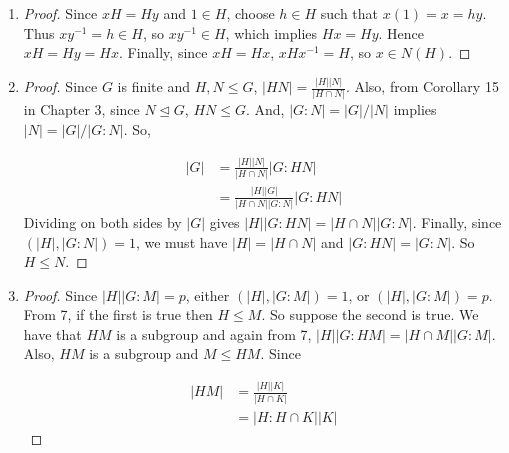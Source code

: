 \documentclass[11pt, letterpaper]{article}
\begin{document}
\begin{enumerate}
\begin{enumerate}
\begin{proof}
      Thus, $G$ is either Abelian or $\vert Z(G) \vert = 1$ so $Z(G) = 1$.
      \end{proof}
  \end{enumerate}
  \item \begin{proof}
    Since $xH = Hy$ and $1 \in H$, choose $h \in H$ such that $x(1) = x = hy$. Thus $xy^{-1} = h \in H$, so $xy^{-1} \in H$, which implies $Hx = Hy$. Hence $xH = Hy = Hx$. Finally, since $xH = Hx$, $xHx^{-1} = H$, so $x \in N(H)$.
  \end{proof}
  \item \begin{proof}
    Since $G$ is finite and $H, N \leq G$, $\vert HN \vert = \frac{\vert H \vert \vert N \vert}{\vert H \cap N \vert}$.
    Also, from Corollary 15 in Chapter 3, since $N \trianglelefteq G$, $HN \leq G$.
    And, $\vert G : N \vert = \vert G \vert/\vert N \vert$ implies $\vert N \vert = \vert G \vert / \vert G : N \vert$. So,

    \begin{align*}
      \vert G \vert &= \frac{\vert H \vert \vert N \vert}{\vert H \cap N \vert} \vert G : HN \vert \\
      &= \frac{\vert H \vert \vert G \vert}{\vert H \cap N \vert \vert G : N \vert} \vert G : HN \vert
    \end{align*}
    Dividing on both sides by $\vert G \vert$ gives $\vert H \vert \vert G : HN \vert = \vert H \cap N \vert \vert G : N \vert$. Finally, since $(\vert H \vert, \vert G : N \vert) = 1$, we must have $\vert H \vert = \vert H \cap N \vert$ and $\vert G : HN \vert = \vert G : N \vert$. So $H \leq N$.
  \end{proof}

  \item \begin{proof}
    Since $\vert H \vert \vert G : M \vert = p$, either $(\vert H \vert, \vert G : M \vert) = 1$, or $(\vert H \vert, \vert G : M \vert) = p$. From 7, if the first is true then $H \leq M$. So suppose the second is true. We have that $HM$ is a subgroup and again from 7, $\vert H \vert \vert G : HM \vert = \vert H \cap M \vert \vert G : M \vert$. Also, $HM$ is a subgroup and $M \leq HM$. Since

    \begin{align*}
      \vert HM \vert &= \frac{\vert H \vert \vert K \vert}{\vert H \cap K \vert} \\
      &= \vert H : H \cap K \vert \vert K \vert
    \end{align*}


\end{proof}
\end{enumerate}
\end{document}
